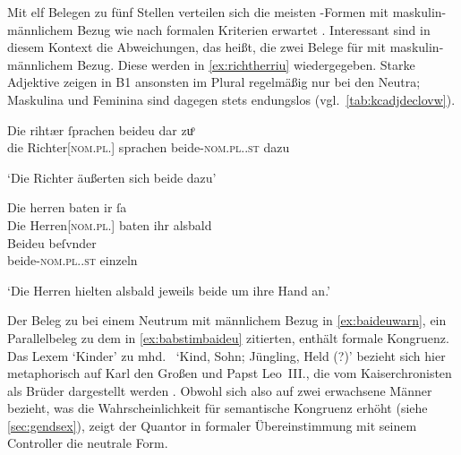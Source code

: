 Mit elf Belegen zu fünf Stellen verteilen sich die meisten
-Formen mit maskulin-männlichem Bezug wie nach formalen Kriterien
erwartet \autocite[vgl.][182]{ksw2}. Interessant sind in diesem Kontext die
Abweichungen, das heißt, die zwei Belege für  mit
maskulin-männlichem Bezug. Diese werden in \cref{ex:richtherriu} wiedergegeben.
Starke Adjektive zeigen in B1 ansonsten  im Plural
regel\-mäßig nur bei den Neutra; Maskulina und Feminina sind dagegen stets
endungslos (vgl.~\cref{tab:kcadjdeclovw}).

\begin{exe}
\ex \label{ex:richtherriu}
	\begin{xlist}
	\ex \gll Die rihtær ſprachen beideu {dar zuͦ} \\
			die Richter[\textsc{nom.pl.\MascM}] sprachen beide-\textsc{nom.pl.\NeutM.st}
			dazu \\
		\begin{taggedline}{\parencites[\pno~28ra,8]{kc:B1}[vgl.~abweichend][10090]{schroeder1895}} %
		\trans `Die Richter äußerten sich beide dazu'
		\end{taggedline}
		\label{ex:richtherriu_1}

	\ex \gll Die herren baten ir ſa \\
			Die Herren[\textsc{nom.pl.\MascM}] baten ihr alsbald \\
	\sn \gll Beideu beſvnder \\
			beide-\textsc{nom.pl.\NeutM.st} einzeln \\
		\begin{taggedline}{\parencites[\pno~31va,48--49]{kc:B1}[vgl.][11385--11386]{schroeder1895}} %
		\trans `Die Herren hielten alsbald jeweils beide um ihre Hand an.'
		\end{taggedline}
		\label{ex:richtherriu_2}
	\end{xlist}
\end{exe}

\label{phsec:baideuwarn}
Der Beleg zu  bei einem Neutrum mit männlichem Bezug in
\cref{ex:baideuwarn}, ein Parallelbeleg zu dem in \cref{ex:babstimbaideu}
zitierten, enthält formale Kongruenz. Das Lexem  `Kinder' zu
mhd.\  `Kind, Sohn; Jüngling, Held (?)'
\autocites[\pno~]{mwb1}[vgl.~auch][53]{kroonen2013} bezieht sich hier
metaphorisch auf Karl den Großen und Papst Leo~III., die vom Kaiserchronisten
als Brüder dargestellt werden
\autocites[14370]{schroeder1895}[vgl.][83]{weis2022}. Obwohl sich 
also auf zwei erwachsene Männer bezieht, was die Wahrscheinlichkeit für
semantische Kongruenz erhöht (siehe \cref{sec:gendsex}), zeigt der Quantor in
formaler Übereinstimmung mit seinem Controller die neutrale Form.

